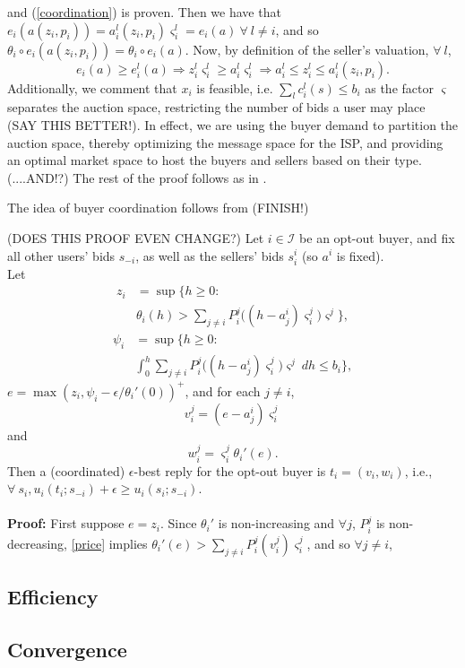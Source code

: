 \documentclass[12pt]{article}
\theoremstyle{definition}
\newcommand{\vs}{\varsigma}
\begin{document}
\begin{multicols}{2}
and (\ref{coordination}) is proven. Then we have that $e_i(a(z_i,p_i)) =
a_i^l(z_i,p_i)\vs_i^l
= e_i(a) \ \forall \ l\ne i$, and so
$\theta_i\circ e_i(a(z_i, p_i)) = \theta_i\circ e_i(a)$. Now, by definition of
the seller's valuation, $\forall \ l$,
$$
    e_i(a) \ge e_i^l(a) \Rightarrow z_i^l\vs_i^l \ge a_i^l\vs_i^l \Rightarrow
a_i^l \le z_i^l\le a_i^l(z_i,p_i).
$$ 
Additionally, we comment that $x_i$ is feasible, i.e. $\sum_l c_i^l(s) \le b_i$
as the factor $\vs$ separates the auction space, restricting the number of bids
a user may place (SAY THIS BETTER!). In effect, we are using the buyer demand
to partition the auction space, thereby optimizing the message space for the
ISP, and providing an optimal market space to host the buyers and sellers based
on their type.
(....AND!?) 
The rest of the proof follows as in \cite{semret}.

The idea of buyer coordination follows from \cite{lazar} (FINISH!)

(DOES THIS PROOF EVEN CHANGE?)
{
Let $i\in\mathcal{I}$ be an opt-out buyer, and fix all other users' bids
$s_{-i}$, as well as the sellers' bids $s_i^i$ (so $a^i$ is fixed). \\
Let 
\begin{align}
    z_i &= \sup\bigg\lbrace h\ge 0 : \\
& \theta_i(h) > \displaystyle\sum_{j\ne i}
P_i^j\big((h-a_j^i)\vs_i^j\big)\vs^j\bigg\rbrace, 
\end{align}
\begin{align}\label{price}
    \psi_i &= \sup\bigg\lbrace h\ge 0: \\
&\displaystyle\int_0^h \displaystyle\sum_{j\ne i}
P_i^j\big((h-a_j^i)\vs_i^j\big)\vs^j \ dh \le b_i\bigg\rbrace,
\end{align}
$e = \max(z_i, \psi_i - \epsilon / \theta_i'(0))^+$, and for each $j\ne i$, 
$$
    v_i^j = (e - a_j^i)\vs_i^j
$$
and 
$$
    w_i^j = \vs_i^j\theta_i'(e).
$$
Then a (coordinated) $\epsilon$-best reply for the opt-out buyer is $t_i =
(v_i,w_i)$, i.e., $\forall \ s_i, u_i(t_i;s_{-i}) + \epsilon \ge u_i(s_i;
s_{-i})$.
} \\ \\
\textbf{Proof:} First suppose $e = z_i$. Since $\theta_i'$ is non-increasing
and $\forall j$, $P_i^j$ is non-decreasing, \ref{price} implies $\theta_i'(e) >
\sum_{j\ne i} P_i^j(v_i^j)\vs_i^j$, and so $\forall j\ne i$, 

\subsection{Efficiency}

\subsection{Convergence}

\end{multicols}
\end{document}
